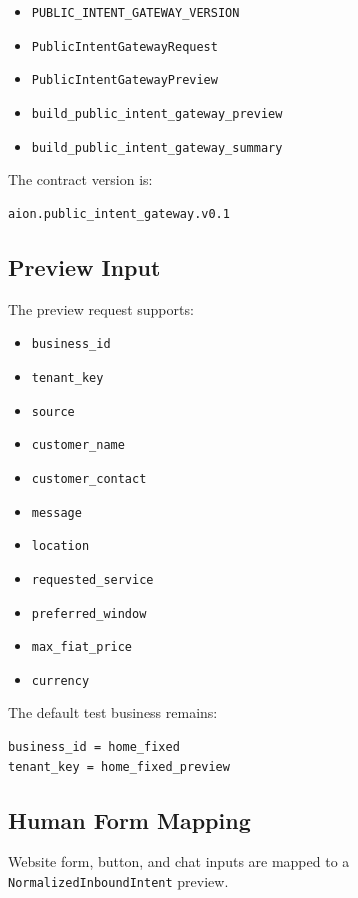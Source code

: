 \begin{itemize}
  \item \texttt{PUBLIC\_INTENT\_GATEWAY\_VERSION}
  \item \texttt{PublicIntentGatewayRequest}
  \item \texttt{PublicIntentGatewayPreview}
  \item \texttt{build\_public\_intent\_gateway\_preview}
  \item \texttt{build\_public\_intent\_gateway\_summary}
\end{itemize}

The contract version is:

\begin{verbatim}
aion.public_intent_gateway.v0.1
\end{verbatim}

\subsection{Preview Input}

The preview request supports:

\begin{itemize}
  \item \texttt{business\_id}
  \item \texttt{tenant\_key}
  \item \texttt{source}
  \item \texttt{customer\_name}
  \item \texttt{customer\_contact}
  \item \texttt{message}
  \item \texttt{location}
  \item \texttt{requested\_service}
  \item \texttt{preferred\_window}
  \item \texttt{max\_fiat\_price}
  \item \texttt{currency}
\end{itemize}

The default test business remains:

\begin{verbatim}
business_id = home_fixed
tenant_key = home_fixed_preview
\end{verbatim}

\subsection{Human Form Mapping}

Website form, button, and chat inputs are mapped to a \texttt{NormalizedInboundIntent} preview.

